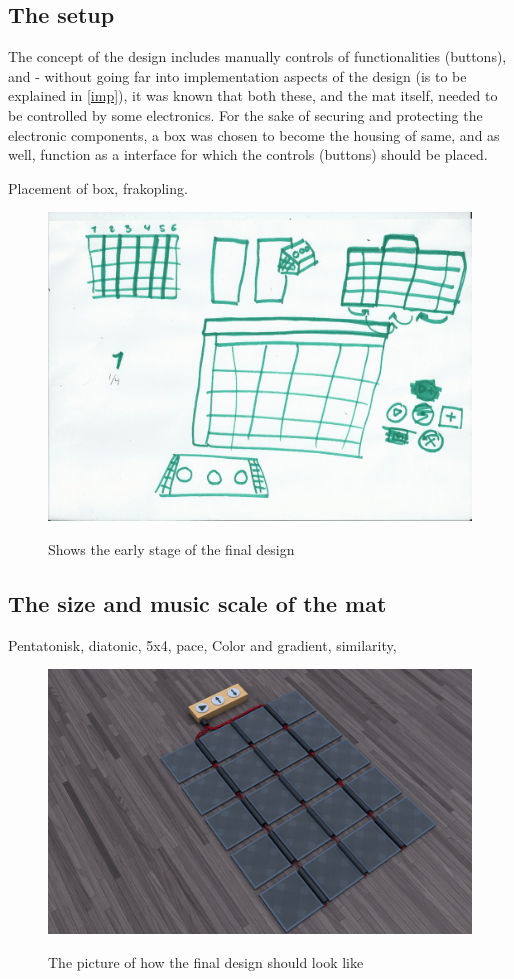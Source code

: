 \subsection{The setup}
The concept of the design includes manually controls of functionalities (buttons), and - without going far into implementation aspects of the design (is to be explained in \autoref{imp}), it was known that both these, and the mat itself, needed to be controlled by some electronics. For the sake of securing and protecting the electronic components, a box was chosen to become the housing of same, and as well, function as a interface for which the controls (buttons) should be placed. 

Placement of box, frakopling.       

\begin{figure}[H]
	\centering
	\includegraphics[width=0.7\linewidth]{figure/Design/sketchOne}
	\label{fig:sketchOne}
	\caption{Shows the early stage of the final design}
	\label{fig:finalbox1}
\end{figure}







\subsection{The size and music scale of the mat }   
Pentatonisk, diatonic, 5x4, pace, Color and  gradient, similarity, 


\begin{figure}[H]
	\centering
	\includegraphics[width=0.7\linewidth]{figure/Design/finaldesign}
	\label{fig:finaldesign}
	\caption{The picture of how the final design should look like}
\end{figure}


